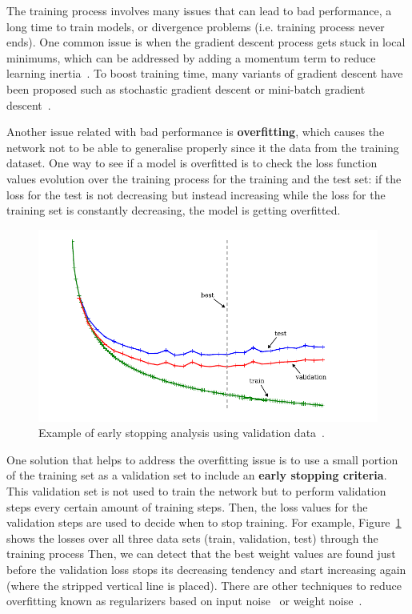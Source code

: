 The training process involves many issues that can lead to bad performance, a long time to 
train models, or divergence problems (i.e. training process never ends). One common issue is 
when the gradient descent process gets stuck in local minimums, which can be addressed by 
adding a momentum term to reduce learning inertia~\cite{appendix:plaut1986experiments}. To 
boost training time, many variants of gradient descent have been proposed such as stochastic 
gradient descent or mini-batch gradient descent~\cite{appendix:lecun1998efficient}.

Another issue related with bad performance is \textbf{overfitting}, which causes the network 
not to be able to generalise properly since it  the data from the training 
dataset. One way to see if a model is overfitted is to check the loss function values 
evolution over the training process for the training and the test set: if the loss for the 
test is not decreasing but instead increasing while the loss for the training set is 
constantly decreasing, the model is getting overfitted.

\begin{figure}[!h]
    \centering
    \includegraphics[scale=.45]{imagenes/appendices/appA_overfitting.PNG}
    \caption{Example of early stopping analysis using validation data~\cite{seqlab:Graves2012-385}.}
    \label{fig:earlyStopppingExample}
\end{figure}

One solution that helps to address the overfitting issue is to use a small portion of the 
training set as a validation set to include an \textbf{early stopping criteria}. This 
validation set is not used to train the network but to perform validation steps every certain 
amount of training steps. Then, the loss values for the validation steps are used to decide 
when to stop training. For example, Figure~\ref{fig:earlyStopppingExample} shows the losses 
over all three data sets (train, validation, test) through the training process Then, we can 
detect that the best weight values are found just before the validation loss stops its 
decreasing tendency and start increasing again (where the  stripped vertical line is 
placed). There are other techniques to reduce overfitting known as regularizers based on 
input noise~\cite{appendix:an1996effects, appendix:koistinen1991kernel, appendix:bishop1995neural} 
or weight noise~\cite{appendix:murray1994enhanced,appendix:jim1996analysis}.

